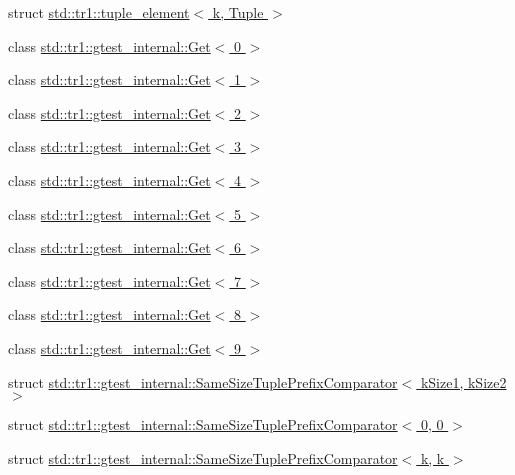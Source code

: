 \begin{DoxyCompactItemize}
\item 
struct \hyperlink{structstd_1_1tr1_1_1tuple__element}{std\+::tr1\+::tuple\+\_\+element$<$ k, Tuple $>$}
\item 
class \hyperlink{classstd_1_1tr1_1_1gtest__internal_1_1_get_3_010_01_4}{std\+::tr1\+::gtest\+\_\+internal\+::\+Get$<$ 0 $>$}
\item 
class \hyperlink{classstd_1_1tr1_1_1gtest__internal_1_1_get_3_011_01_4}{std\+::tr1\+::gtest\+\_\+internal\+::\+Get$<$ 1 $>$}
\item 
class \hyperlink{classstd_1_1tr1_1_1gtest__internal_1_1_get_3_012_01_4}{std\+::tr1\+::gtest\+\_\+internal\+::\+Get$<$ 2 $>$}
\item 
class \hyperlink{classstd_1_1tr1_1_1gtest__internal_1_1_get_3_013_01_4}{std\+::tr1\+::gtest\+\_\+internal\+::\+Get$<$ 3 $>$}
\item 
class \hyperlink{classstd_1_1tr1_1_1gtest__internal_1_1_get_3_014_01_4}{std\+::tr1\+::gtest\+\_\+internal\+::\+Get$<$ 4 $>$}
\item 
class \hyperlink{classstd_1_1tr1_1_1gtest__internal_1_1_get_3_015_01_4}{std\+::tr1\+::gtest\+\_\+internal\+::\+Get$<$ 5 $>$}
\item 
class \hyperlink{classstd_1_1tr1_1_1gtest__internal_1_1_get_3_016_01_4}{std\+::tr1\+::gtest\+\_\+internal\+::\+Get$<$ 6 $>$}
\item 
class \hyperlink{classstd_1_1tr1_1_1gtest__internal_1_1_get_3_017_01_4}{std\+::tr1\+::gtest\+\_\+internal\+::\+Get$<$ 7 $>$}
\item 
class \hyperlink{classstd_1_1tr1_1_1gtest__internal_1_1_get_3_018_01_4}{std\+::tr1\+::gtest\+\_\+internal\+::\+Get$<$ 8 $>$}
\item 
class \hyperlink{classstd_1_1tr1_1_1gtest__internal_1_1_get_3_019_01_4}{std\+::tr1\+::gtest\+\_\+internal\+::\+Get$<$ 9 $>$}
\item 
struct \hyperlink{structstd_1_1tr1_1_1gtest__internal_1_1_same_size_tuple_prefix_comparator}{std\+::tr1\+::gtest\+\_\+internal\+::\+Same\+Size\+Tuple\+Prefix\+Comparator$<$ k\+Size1, k\+Size2 $>$}
\item 
struct \hyperlink{structstd_1_1tr1_1_1gtest__internal_1_1_same_size_tuple_prefix_comparator_3_010_00_010_01_4}{std\+::tr1\+::gtest\+\_\+internal\+::\+Same\+Size\+Tuple\+Prefix\+Comparator$<$ 0, 0 $>$}
\item 
struct \hyperlink{structstd_1_1tr1_1_1gtest__internal_1_1_same_size_tuple_prefix_comparator_3_01k_00_01k_01_4}{std\+::tr1\+::gtest\+\_\+internal\+::\+Same\+Size\+Tuple\+Prefix\+Comparator$<$ k, k $>$}
\end{DoxyCompactItemize}
